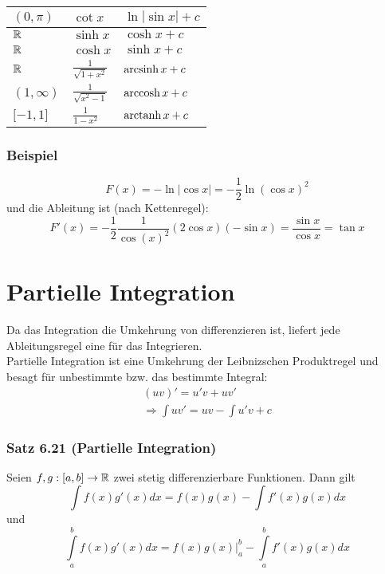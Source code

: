 \begin{tabularx}{\textwidth}{|Y|Y|Y|}
$(0,\pi)$        & $\cot{x}$                             & $\ln \left| {\sin x} \right| + c$                                                                \\[1.5ex]\hline
$\mathbb{R}$ & $\sinh x$ & $\cosh x + c$\\[1.5ex]\hline
$\mathbb{R}$ & $\cosh x$ & $\sinh x + c$\\[1.5ex]\hline
$\mathbb{R}$ & $\frac{1}{\sqrt{1+x^2}}$  & $\operatorname{arcsinh} x + c$ \\[1.5ex]\hline
$(1,\infty)$ & $\frac{1}{\sqrt{x^2-1}}$ & $\operatorname{arccosh} x + c$ \\[1.5ex]\hline
$\lbrack -1,1\rbrack$ & $\frac{1}{1-x^2}$ & $\operatorname{arctanh} x + c$ \\[1.5ex]\hline
 \end{tabularx}

\subsubsection*{Beispiel}
\[F(x)=-\ln\left| \cos x \right| = -\frac{1}{2}\ln\left(\cos x\right)^2\]
und die Ableitung ist (nach Kettenregel):
\[F'(x) =  - \frac{1}{2}\frac{1}{{\cos {{(x)}^2}}}(2\cos x)( - \sin x) = \frac{{\sin x}}{{\cos x}} = \tan x\]

\section{Partielle Integration}
Da das Integration die Umkehrung von differenzieren ist, liefert jede Ableitungsregel eine für das Integrieren.\\

Partielle Integration ist eine Umkehrung der Leibnizschen Produktregel und besagt für unbestimmte bzw. das bestimmte Integral:
\[\begin{array}{c}
(uv)' = u'v + uv'\\
 \Rightarrow \int {uv'}  = uv - \int {u'v}  + c
\end{array}\]

\subsubsection*{Satz 6.21 (Partielle Integration)}
Seien $f,g:\lbrack a,b\rbrack\to\mathbb{R}$ zwei stetig differenzierbare Funktionen. Dann gilt 
\[\int {f(x)g'(x)dx = f(x)g(x) - \int {f'(x)g(x)dx} } \]
und
\[\int\limits_a^b {f(x)g'(x)dx = \left. {f(x)g(x)} \right|_a^b - \int\limits_a^b {f'(x)g(x)dx} } \]

